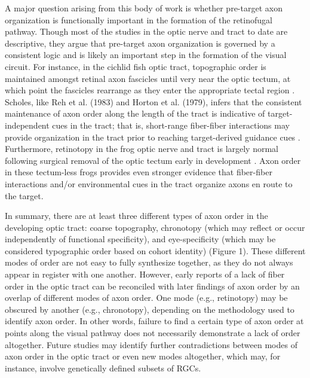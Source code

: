 A major question arising from this body of work is whether pre-target axon organization is functionally important in the formation of the retinofugal pathway. 
Though most of the studies in the optic nerve and tract to date are descriptive, they argue that pre-target axon organization is governed by a consistent logic and is likely an important step in the formation of the visual circuit. 
For instance, in the cichlid fish optic tract, topographic order is maintained amongst retinal axon fascicles until very near the optic tectum, at which point the fascicles rearrange as they enter the appropriate tectal region \cite{scholes1979nerve}. 
Scholes, like Reh et al. (1983) and Horton et al. (1979), infers that the consistent maintenance of axon order along the length of the tract is indicative of target-independent cues in the tract; that is, short-range fiber-fiber interactions may provide organization in the tract prior to reaching target-derived guidance cues \cite{scholes1979nerve}. 
Furthermore, retinotopy in the frog optic nerve and tract is largely normal following surgical removal of the optic tectum early in development \cite{reh1983organization}. 
Axon order in these tectum-less frogs provides even stronger evidence that fiber-fiber interactions and/or environmental cues in the tract organize axons en route to the target. 

In summary, there are at least three different types of axon order in the developing optic tract: coarse topography, chronotopy (which may reflect or occur independently of functional specificity), and eye-specificity (which may be considered typographic order based on cohort identity) (Figure 1).
These different modes of order are not easy to fully synthesize together, as they do not always appear in register with one another. 
However, early reports of a lack of fiber order in the optic tract \cite{horton1979non} can be reconciled with later findings of axon order by an overlap of different modes of axon order. 
One mode (e.g., retinotopy) may be obscured by another (e.g., chronotopy), depending on the methodology used to identify axon order. 
In other words, failure to find a certain type of axon order at points along the visual pathway does not necessarily demonstrate a lack of order altogether. 
Future studies may identify further contradictions between modes of axon order in the optic tract or even new modes altogether, which may, for instance, involve genetically defined subsets of RGCs. 